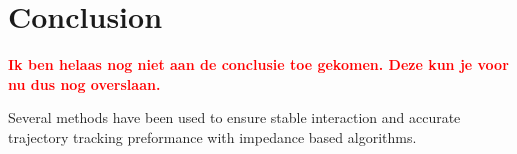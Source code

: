 \chapter{Conclusion}
\label{chapter:conclusion}





\textbf{\textcolor{red}{Ik ben helaas nog niet aan de conclusie toe gekomen. Deze kun je voor nu dus nog overslaan.}}

Several methods have been used to ensure stable interaction and accurate trajectory tracking preformance with impedance based algorithms.

